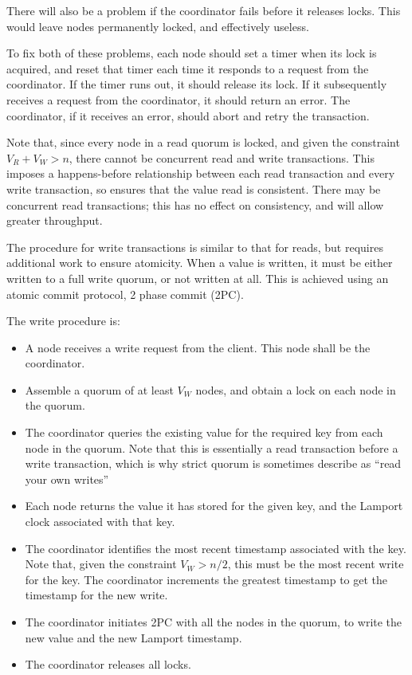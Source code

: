 \documentclass[12pt,a4paper,twoside,openright]{report}
\begin{document}
There will also be a problem if the coordinator fails before it releases locks. This would leave nodes permanently locked, and effectively useless.

To fix both of these problems, each node should set a timer when its lock is acquired, and reset that timer each time it responds to a request from the coordinator. If the timer runs out, it should release its lock. If it subsequently receives a request from the coordinator, it should return an error. The coordinator, if it receives an error, should abort and retry the transaction.

Note that, since every node in a read quorum is locked, and given the constraint $V_R + V_W > n$, there cannot be concurrent read and write transactions. This imposes a happens-before relationship between each read transaction and every write transaction, so ensures that the value read is consistent. There may be concurrent read transactions; this has no effect on consistency, and will allow greater throughput.

The procedure for write transactions is similar to that for reads, but requires additional work to ensure atomicity. When a value is written, it must be either written to a full write quorum, or not written at all. This is achieved using an atomic commit protocol, 2 phase commit (2PC).

The write procedure is:

\begin{itemize}
\item
A node receives a write request from the client. This node shall be the coordinator.

\item
Assemble a quorum of at least $V_W$ nodes, and obtain a lock on each node in the quorum.

\item
The coordinator queries the existing value for the required key from each node in the quorum. Note that this is essentially a read transaction before a write transaction, which is why strict quorum is sometimes describe as ``read your own writes''

\item
Each node returns the value it has stored for the given key, and the Lamport clock associated with that key.

\item
The coordinator identifies the most recent timestamp associated with the key. Note that, given the constraint $V_W > n / 2$, this must be the most recent write for the key. The coordinator increments the greatest timestamp to get the timestamp for the new write.

\item
The coordinator initiates 2PC with all the nodes in the quorum, to write the new value and the new Lamport timestamp.

\item
The coordinator releases all locks.

\end{itemize}
\end{document}
